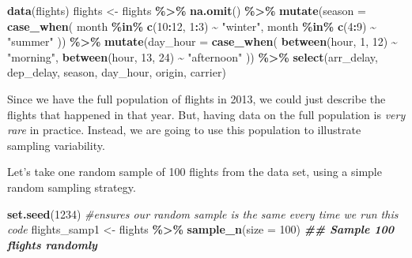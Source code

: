 \documentclass[
]{book}
\newenvironment{Shaded}{\begin{snugshade}}{\end{snugshade}}
\newcommand{\AttributeTok}[1]{\textcolor[rgb]{0.13,0.29,0.53}{#1}}
\newcommand{\CommentTok}[1]{\textcolor[rgb]{0.56,0.35,0.01}{\textit{#1}}}
\newcommand{\DecValTok}[1]{\textcolor[rgb]{0.00,0.00,0.81}{#1}}
\newcommand{\DocumentationTok}[1]{\textcolor[rgb]{0.56,0.35,0.01}{\textbf{\textit{#1}}}}
\newcommand{\FunctionTok}[1]{\textcolor[rgb]{0.13,0.29,0.53}{\textbf{#1}}}
\newcommand{\NormalTok}[1]{#1}
\newcommand{\OtherTok}[1]{\textcolor[rgb]{0.56,0.35,0.01}{#1}}
\newcommand{\SpecialCharTok}[1]{\textcolor[rgb]{0.81,0.36,0.00}{\textbf{#1}}}
\newcommand{\StringTok}[1]{\textcolor[rgb]{0.31,0.60,0.02}{#1}}
\begin{document}
\begin{Shaded}
\begin{Highlighting}[]
\FunctionTok{data}\NormalTok{(flights)}
\NormalTok{flights }\OtherTok{\textless{}{-}}\NormalTok{ flights }\SpecialCharTok{\%\textgreater{}\%} 
    \FunctionTok{na.omit}\NormalTok{() }\SpecialCharTok{\%\textgreater{}\%}
    \FunctionTok{mutate}\NormalTok{(}\AttributeTok{season =} \FunctionTok{case\_when}\NormalTok{(}
\NormalTok{      month }\SpecialCharTok{\%in\%} \FunctionTok{c}\NormalTok{(}\DecValTok{10}\SpecialCharTok{:}\DecValTok{12}\NormalTok{, }\DecValTok{1}\SpecialCharTok{:}\DecValTok{3}\NormalTok{) }\SpecialCharTok{\textasciitilde{}} \StringTok{"winter"}\NormalTok{,}
\NormalTok{      month }\SpecialCharTok{\%in\%} \FunctionTok{c}\NormalTok{(}\DecValTok{4}\SpecialCharTok{:}\DecValTok{9}\NormalTok{) }\SpecialCharTok{\textasciitilde{}} \StringTok{"summer"}
\NormalTok{    )) }\SpecialCharTok{\%\textgreater{}\%} 
    \FunctionTok{mutate}\NormalTok{(}\AttributeTok{day\_hour =} \FunctionTok{case\_when}\NormalTok{(}
      \FunctionTok{between}\NormalTok{(hour, }\DecValTok{1}\NormalTok{, }\DecValTok{12}\NormalTok{) }\SpecialCharTok{\textasciitilde{}} \StringTok{"morning"}\NormalTok{,}
      \FunctionTok{between}\NormalTok{(hour, }\DecValTok{13}\NormalTok{, }\DecValTok{24}\NormalTok{) }\SpecialCharTok{\textasciitilde{}} \StringTok{"afternoon"}
\NormalTok{    )) }\SpecialCharTok{\%\textgreater{}\%} 
    \FunctionTok{select}\NormalTok{(arr\_delay, dep\_delay, season, day\_hour, origin, carrier)}
\end{Highlighting}
\end{Shaded}

Since we have the full population of flights in 2013, we could just describe the flights that happened in that year. But, having data on the full population is \emph{very rare} in practice. Instead, we are going to use this population to illustrate sampling variability.

Let's take one random sample of 100 flights from the data set, using a simple random sampling strategy.

\begin{Shaded}
\begin{Highlighting}[]
\FunctionTok{set.seed}\NormalTok{(}\DecValTok{1234}\NormalTok{) }\CommentTok{\#ensures our random sample is the same every time we run this code}
\NormalTok{flights\_samp1 }\OtherTok{\textless{}{-}}\NormalTok{ flights }\SpecialCharTok{\%\textgreater{}\%}
    \FunctionTok{sample\_n}\NormalTok{(}\AttributeTok{size =} \DecValTok{100}\NormalTok{) }\DocumentationTok{\#\# Sample 100 flights randomly}
\end{Highlighting}
\end{Shaded}
\end{document}
